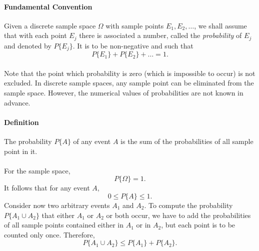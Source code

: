 \documentclass{article}
\numberwithin{equation}{subsection}
\begin{document}
			\paragraph{Fundamental Convention} Given a discrete sample space $\Omega$ with sample points $E_1, E_2, \dots$, we shall assume that with each point $E_j$ there is associated a number, called the \textit{probability} of $E_j$ and denoted by $P\{E_j\}$. It is to be non-negative and such that
			\begin{equation}
				\label{eq:1.7.1}
				P\{E_1\}+P\{E_2\}+\dots=1.
			\end{equation}
			\paragraph{}Note that the point which probability is zero (which is impossible to occur) is not excluded. In discrete sample spaces, any sample point can be eliminated from the sample space. However, the numerical values of probabilities are not known in advance.
			\paragraph{Definition} The probability $P\{A\}$ of any event $A$ is the sum of the probabilities of all sample point in it.
			\paragraph{} For the sample space, 
			\begin{equation}
				\label{eq:1.7.2}
				P\{\Omega\}=1.
			\end{equation}
			It follows that for any event $A$, 
			\begin{equation}
				\label{eq:1.7.3}
				0\leq P\{A\} \leq 1.
			\end{equation}
			Consider now two arbitrary events $A_1$ and $A_2$. To compute the probability $P\{A_1\cup A_2\}$ that either $A_1$ or $A_2$ or both occur, we have to add the probabilities of all sample points contained either in $A_1$ or in $A_2$, but each point is to be counted only once. Therefore, 
			\begin{equation}
				\label{eq:1.7.4}
				P\{A_1\cup A_2\} \leq P\{A_1\}+P\{A_2\}.
			\end{equation}
\end{document}
